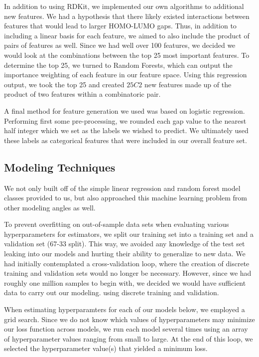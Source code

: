 \documentclass[11pt, oneside]{article}   	%
\begin{document}
In addition to using RDKit, we implemented our own algorithms to additional new features. We had a hypothesis that there likely existed interactions between features that would lead to larger HOMO-LUMO gaps. Thus, in addition to including a linear basis for each feature, we aimed to also include the product of pairs of features as well. Since we had well over 100 features, we decided we would look at the combinations between the top 25 most important features. To determine the top 25, we turned to Random Forests, which can output the importance weighting of each feature in our feature space. Using this regression output, we took the top 25 and created $25C2$ new features made up of the product of two features within a combinatoric pair. 

A final method for feature generation we used was based on logistic regression. Performing first some pre-processing, we rounded each gap value to the nearest half integer which we set as the labels we wished to predict. We ultimately used these labels as categorical features that were included in our overall feature set. 

\subsection{Modeling Techniques} 

We not only built off of the simple linear regression and random forest model classes provided to us, but also approached this machine learning problem from other modeling angles as well. 

To prevent overfitting on out-of-sample data sets when evaluating various hyperparameters for estimators, we split our training set into a training set and a validation set (67-33 split). This way, we avoided any knowledge of the test set leaking into our models and hurting their ability to generalize to new data. We had initially contemplated a cross-validation loop, where the creation of discrete training and validation sets would no longer be necessary. However, since we had roughly one million samples to begin with, we decided we would have sufficient data to carry out our modeling. using discrete training and validation.

When estimating hyperparamters for each of our models below, we employed a grid search. Since we do not know which values of hyperparameters may minimize our loss function across models, we run each model several times using an array of hyperparameter values ranging from small to large. At the end of this loop, we selected the hyperparameter value(s) that yielded a minimum loss. 
\end{document}
